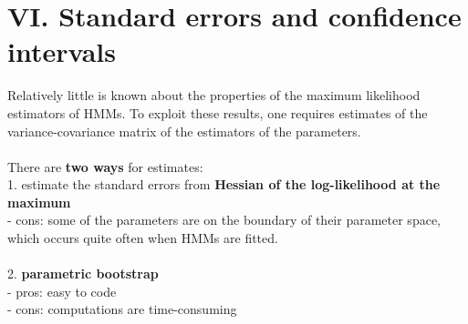 \documentclass{article}
\begin{document}
\section*{VI. Standard errors and confidence intervals}
Relatively little is known about the properties of the maximum likelihood estimators of HMMs. To exploit these results, one requires estimates of the variance-covariance matrix of the estimators of the parameters. \\
\\
There are \textbf{two ways} for estimates: \\
1. estimate the standard errors from \textbf{Hessian of the log-likelihood at the maximum} \\
- cons: some of the parameters are on the boundary of their parameter space, which occurs quite often when HMMs are fitted. \\
\\
2. \textbf{parametric bootstrap} \\
- pros: easy to code \\
- cons: computations are time-consuming
\end{document}
